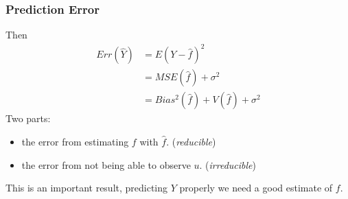 \documentclass[
  shownotes,
  xcolor={svgnames},
  hyperref={colorlinks,citecolor=DarkBlue,linkcolor=DarkRed,urlcolor=DarkBlue}
  ]{beamer}
\begin{document}
\begin{frame}
\frametitle{Prediction Error}


\bigskip
Then 
\begin{align}
  Err (\hat Y )  &= E(Y-\hat f)^2  \\
                 &= MSE(\hat f) + \sigma^2  \\
                 &= Bias^2(\hat f) + V(\hat f) + \sigma^2
\end{align}
\bigskip
Two parts:
\begin{itemize}
  \item  the error from estimating $f$ with $\hat f$. (\emph{reducible})
  \item  the error from not being able to observe $u$. (\emph{irreducible})
\end{itemize}

\bigskip

This is an important result, predicting $Y$ properly we need a good estimate of $f$.

\end{frame}

\end{document}

